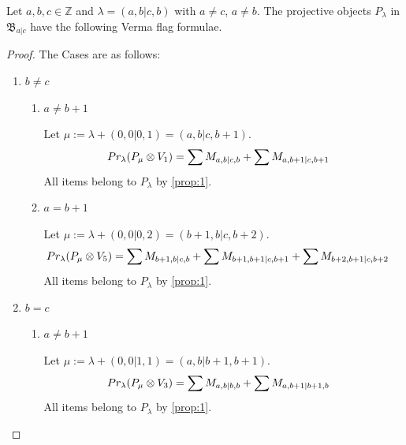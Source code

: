 \begin{theorem}
  Let $a,b,c \in \mathbb{Z}$ and $\lambda = (a,b|c,b)$ with $a \neq c$, $ a \neq b$. The projective objects $P_{\lambda}$ in $\mathfrak{B}_{a|c}$ have the following Verma flag formulae.
\end{theorem}
\begin{proof} The Cases are as follows:\par
  \begin{enumerate}
    \item $b \neq c$
      \begin{enumerate}
        \item $ a\neq b+1 $ \par
      Let $\mu:=\lambda + (0,0|0,1) = (a,b|c,b+1) $.
      \begin{equation}\notag
        \begin{aligned}
          Pr_{\lambda}(P_\mu \otimes V_{1}) &=
\sum M_{a,b|c,b}
+\sum M_{a,b+1|c,b+1}
        \end{aligned}
      \end{equation}
All items belong to $P_\lambda$ by \cref{prop:1}.

        \item $ a = b+1 $ \par
      Let $\mu:=\lambda + (0,0|0,2) = (b+1,b|c,b+2) $.
      \begin{equation}\notag
        \begin{aligned}
          Pr_{\lambda}(P_\mu \otimes V_{5}) &=
\sum M_{b+1,b|c,b}
+\sum M_{b+1,b+1|c,b+1}
+\sum M_{b+2,b+1|c,b+2}
        \end{aligned}
      \end{equation}
All items belong to $P_\lambda$ by \cref{prop:1}.
      \end{enumerate}

    \item $b = c$
      \begin{enumerate}
        \item $a\neq b+1$ \par
      Let $\mu:=\lambda + (0,0|1,1) = (a,b|b+1,b+1) $.
      \begin{equation}\notag
        \begin{aligned}
          Pr_{\lambda}(P_\mu \otimes V_{3}) &=
\sum M_{a,b|b,b}
+\sum M_{a,b+1|b+1,b}
        \end{aligned}
      \end{equation}
All items belong to $P_\lambda$ by \cref{prop:1}.
      \end{enumerate}


\end{enumerate}
\end{proof}
